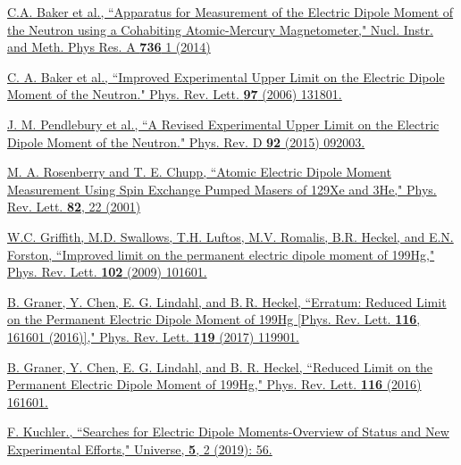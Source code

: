 \begin{thebibliography}{99}
 \href{https://www.sciencedirect.com/science/article/pii/S0168900213013193}{C.A. Baker et al., ``Apparatus for Measurement of the Electric Dipole Moment of the Neutron using a Cohabiting Atomic-Mercury Magnetometer," Nucl. Instr. and Meth. Phys Res. A \textbf{736} 1 (2014) }

 \href{https://journals.aps.org/prl/abstract/10.1103/PhysRevLett.97.131801}{C. A. Baker et al., ``Improved Experimental Upper Limit on the Electric Dipole Moment of the Neutron." Phys. Rev. Lett. \textbf{97} (2006) 131801.}

 \href{https://journals.aps.org/prd/abstract/10.1103/PhysRevD.92.092003}{J. M. Pendlebury et al., ``A Revised Experimental Upper Limit on the Electric Dipole Moment of the Neutron." Phys. Rev. D \textbf{92} (2015) 092003.}

\href{https://journals.aps.org/prl/abstract/10.1103/PhysRevLett.86.22}{M. A. Rosenberry and T. E. Chupp, ``Atomic Electric Dipole Moment Measurement Using Spin Exchange Pumped Masers of 129Xe and 3He," Phys. Rev. Lett. \textbf{82}, 22 (2001)}

\href{https://journals.aps.org/prl/abstract/10.1103/PhysRevLett.102.101601}{ W.C. Griffith, M.D. Swallows, T.H. Luftos, M.V. Romalis, B.R. Heckel, and E.N. Forston, ``Improved limit on the permanent electric dipole moment of 199Hg," Phys. Rev. Lett. \textbf{102} (2009) 101601.}

\href{https://journals.aps.org/prl/abstract/10.1103/PhysRevLett.119.119901}{B. Graner, Y. Chen, E. G. Lindahl, and B. R. Heckel, ``Erratum: Reduced Limit on the Permanent Electric Dipole Moment of 199Hg [Phys. Rev. Lett. \textbf{116}, 161601 (2016)],"
Phys. Rev. Lett. \textbf{119} (2017) 119901.}

\href{https://journals.aps.org/prl/abstract/10.1103/PhysRevLett.116.161601}{B. Graner, Y. Chen, E. G. Lindahl, and B. R. Heckel, ``Reduced Limit on the Permanent Electric Dipole Moment of 199Hg," Phys. Rev. Lett. \textbf{116} (2016) 161601.}

 \href{https://www.mdpi.com/2218-1997/5/2/56}{F. Kuchler., ``Searches for Electric Dipole Moments-Overview of
Status and New Experimental Efforts,"  Universe, \textbf{5}, 2 (2019): 56.}



\end{thebibliography}